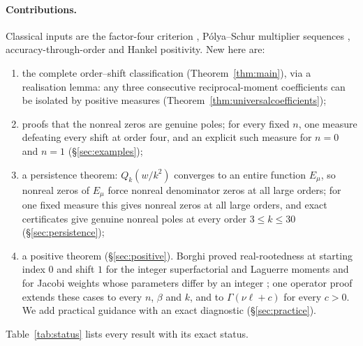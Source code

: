 \documentclass[11pt,a4paper]{article}
\theoremstyle{definition}
\theoremstyle{remark}
\begin{document}
\paragraph{Contributions.} Classical inputs are the factor-four criterion
\cite{Hutchinson1923,Kurtz1992}, Pólya--Schur multiplier sequences
\cite{PolyaSchur1914,CravenCsordas1989}, accuracy-through-order
\cite{Homeier2000} and Hankel positivity. New here are:
\begin{enumerate}
\item the complete order--shift classification (Theorem~\ref{thm:main}),
via a realisation lemma: any three consecutive reciprocal-moment
coefficients can be isolated by positive measures
(Theorem~\ref{thm:universalcoefficients});
\item proofs that the nonreal zeros are genuine poles; for every fixed $n$,
one measure defeating every shift at order four, and an explicit such
measure for $n=0$ and $n=1$ (\S\ref{sec:examples});
\item a persistence theorem: $Q_k(w/k^2)$ converges to an entire function
$E_\mu$, so nonreal zeros of $E_\mu$ force nonreal denominator zeros at
all large orders; for one fixed measure this gives nonreal zeros at all
large orders, and exact certificates give genuine nonreal poles at every
order $3\le k\le30$ (\S\ref{sec:persistence});
\item a positive theorem (\S\ref{sec:positive}). Borghi proved
real-rootedness at starting index $0$ and shift $1$ for the integer
superfactorial and Laguerre moments and for Jacobi weights whose
parameters differ by an integer \cite[\S\S4.2, 4.3, 4.6]{Borghi2026}; one
operator proof extends these cases to every $n$, $\beta$ and $k$, and
to $\Gamma(\nu\ell+c)$ for every $c>0$. We add practical guidance with an
exact diagnostic (\S\ref{sec:practice}).
\end{enumerate}
Table~\ref{tab:status} lists every result with its exact status.
\end{document}
